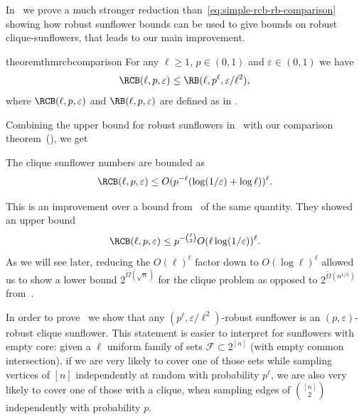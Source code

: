 In~ we prove a much stronger reduction than~\eqref{eq:simple-rcb-rb-comparison} showing how robust sunflower bounds can be used to give bounds on robust clique-sunflowers, that leads to our main improvement.

\begin{restatable}{theorem}{thmrcbcomparison}
\label{thm:rcb-comparison}
For any $\ell \geq 1$, $p \in (0,1)$ and $\varepsilon \in (0,1)$ we have
\begin{equation*}
    \RCB(\ell, p, \varepsilon) \leq \RB(\ell, p^\ell, \varepsilon/ \ell^2),
\end{equation*}
where $\RCB(\ell, p, \varepsilon)$ and $\RB(\ell, p, \varepsilon)$ are defined as in .
\end{restatable}

Combining the upper bound for robust sunflowers in~ with our comparison theorem~(), we get
\begin{corollary}
\label{cor:our-rcb}
    The clique sunflower numbers are bounded as
    \begin{equation*}
        \RCB(\ell, p, \varepsilon) \leq O(p^{-\ell} (\log(1/\varepsilon) + \log \ell))^{\ell}.
    \end{equation*}
\end{corollary}


This is an improvement over a bound from~\cite[Lemma 3.2]{cavalar2022} of the same quantity. They showed an upper bound
\begin{equation}
\label{eq:cavalar-rcb-bound}
    \RCB(\ell, p, \varepsilon) \leq p^{-\binom{\ell}{2}} O(\ell \log (1/\varepsilon))^\ell.
\end{equation}
As we will see later, reducing the $O(\ell)^\ell$ factor down to $O(\log \ell)^\ell$ allowed us to show a lower bound $2^{\tilde\Omega(\sqrt{n})}$ for the clique problem as opposed to $2^{\tilde\Omega(n^{1/3})}$ from~\cite{alon87,cavalar2022}.

In order to prove~ we show that any $(p^\ell, \varepsilon/\ell^2)$-robust sunflower is an $(p, \varepsilon)$-robust clique sunflower. This statement is easier to interpret for sunflowers with empty core: given a $\ell$ uniform family of sets $\mathcal{F} \subset 2^{[n]}$ (with empty common intersection), if we are very likely to cover one of those sets while sampling vertices of $[n]$ independently at random with probability $p^{\ell}$, we are also very likely to cover one of those with a clique, when sampling edges of $\binom{[n]}{2}$ independently with probability $p$.

